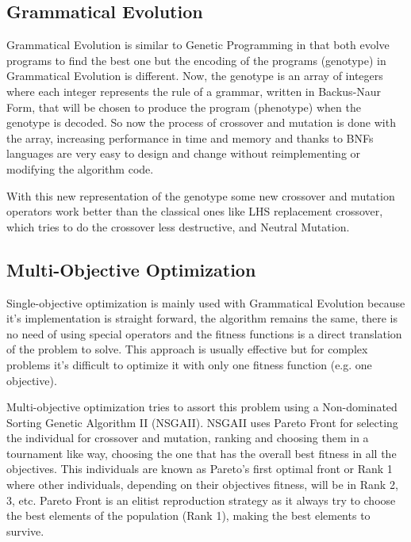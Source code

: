 \documentclass{llncs}
\begin{document}
\subsection{Grammatical Evolution}
Grammatical Evolution is similar to Genetic Programming in that both evolve programs to find the best one but the encoding of the programs (genotype) in Grammatical Evolution is different. Now, the genotype is an array of integers where each integer represents the rule of a grammar, written in Backus-Naur Form,
that will be chosen to produce the program (phenotype) when the genotype is decoded. So now the process of crossover and mutation is done with the array, increasing performance in time and memory and thanks to BNFs languages are very easy to design and change without reimplementing or modifying the algorithm code.%

With this new representation of the genotype some new crossover and mutation operators work better than the classical ones like LHS replacement crossover, which tries to do the crossover less destructive,
and Neutral Mutation. %

\subsection{Multi-Objective Optimization}
Single-objective optimization is mainly used with Grammatical Evolution because it's implementation is straight forward, the algorithm remains the same, there is no need of using special operators and the fitness functions is a direct translation of the problem to solve. This approach is usually effective but for complex problems it's difficult to optimize it with only one fitness function (e.g. one objective).

Multi-objective optimization tries to assort this problem using a Non-dominated Sorting Genetic Algorithm II (NSGAII). NSGAII uses Pareto Front %
for selecting the individual for crossover and mutation, ranking and choosing them in a tournament like way, choosing the one that has the overall best fitness in all the objectives. This individuals are known as Pareto's first optimal front or Rank 1 where other individuals, depending on their objectives fitness, will be in Rank 2, 3, etc. Pareto Front is an elitist reproduction strategy as it always try to choose the best elements of the population (Rank 1), making the best elements to survive. %
\end{document}
